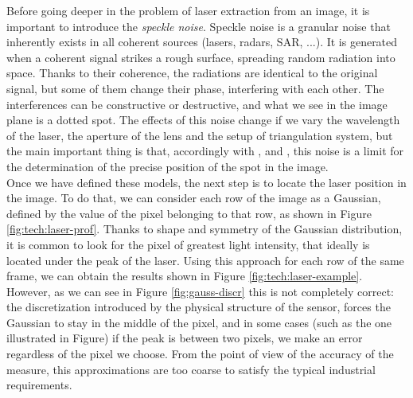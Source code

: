 Before going deeper in the problem of laser extraction from an image, it is important to introduce the \textit{speckle noise}. Speckle noise is a granular noise that inherently exists in all coherent sources (lasers, radars, SAR, ...). It is generated when a coherent signal strikes a rough surface, spreading random radiation into space. Thanks to their coherence, the radiations are identical to the original signal, but some of them change their phase, interfering with each other. The interferences can be constructive or destructive, and what we see in the image plane is a dotted spot. The effects of this noise change if we vary the wavelength of the laser, the aperture of the lens and the setup of triangulation system, but the main important thing is that, accordingly with \cite{Baribeau:91},\cite{Dorsch:94} and \cite{Hausler:88}, this noise is a limit for the determination of the precise position of the spot in the image. \\

Once we have defined these models, the next step is to locate the laser position in the image. To do that, we can consider each row of the image as a Gaussian, defined by the value of the pixel belonging to that row, as shown in Figure \ref{fig:tech:laser-prof}. Thanks to shape and symmetry of the Gaussian distribution, it is common to look for the pixel of greatest light intensity, that ideally is located under the peak of the laser. Using this approach for each row of the same frame, we can obtain the results shown in Figure \ref{fig:tech:laser-example}.
However, as we can see in Figure \ref{fig:gauss-discr} this is not completely correct: the discretization introduced by the physical structure of the sensor, forces the Gaussian to stay in the middle of the pixel, and in some cases (such as the one illustrated in Figure) if the peak is between two pixels, we make an error regardless of the pixel we choose. From the point of view of the accuracy of the measure, this approximations are too coarse to satisfy the typical industrial requirements. \\

